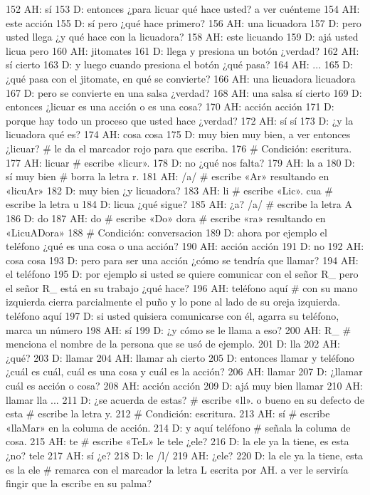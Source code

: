152 AH: sí
153 D: entonces ¿para licuar qué hace usted? a ver cuénteme
154 AH: este acción
155 D: sí pero ¿qué hace primero?
156 AH: una licuadora
157 D: pero usted llega ¿y qué hace con la licuadora?
158 AH: este licuando
159 D: ajá usted licua pero
160 AH: jitomates
161 D: llega y presiona un botón ¿verdad?
162 AH: sí cierto
163 D: y luego cuando presiona el botón ¿qué pasa?
164 AH: ...
165 D: ¿qué pasa con el jitomate, en qué se convierte?
166 AH: una licuadora licuadora
167 D: pero se convierte en una salsa ¿verdad?
168 AH: una salsa sí cierto
169 D: entonces ¿licuar es una acción o es una cosa?
170 AH: acción acción
171 D: porque hay todo un proceso que usted hace ¿verdad?
172 AH: sí sí
173 D: ¿y la licuadora qué es?
174 AH: cosa cosa
175 D: muy bien muy bien, a ver entonces ¿licuar? # le da el marcador rojo para que escriba.
176 # Condición: escritura.
177 AH: licuar # escribe «licur». 
178 D: no ¿qué nos falta?
179 AH: la a
180 D: sí muy bien # borra la letra r.
181 AH: /a/ # escribe «Ar» resultando en «licuAr»
182 D: muy bien ¿y licuadora?
183 AH: li # escribe «Lic». cua # escribe la letra u
184 D: licua ¿qué sigue?
185 AH: ¿a? /a/ # escribe la letra A
186 D: do
187 AH: do # escribe «Do» dora # escribe «ra» resultando en «LicuADora»
188 # Condición: conversacion
189 D: ahora por ejemplo el teléfono ¿qué es una cosa o una acción?
190 AH: acción acción
191 D: no
192 AH: cosa cosa
193 D: pero para ser una acción ¿cómo se tendría que llamar?
194 AH: el teléfono
195 D: por ejemplo si usted se quiere comunicar con el señor R_ pero el señor R_ está en su trabajo ¿qué hace?
196 AH: teléfono aquí # con su mano izquierda cierra parcialmente el puño y lo pone al lado de su oreja izquierda. teléfono aquí
197 D: si usted quisiera comunicarse con él, agarra su teléfono, marca un número
198 AH: sí
199 D: ¿y cómo se le llama a eso?
200 AH: R_ # menciona el nombre de la persona que se usó de ejemplo.
201 D: lla
202 AH: ¿qué?
203 D: llamar
204 AH: llamar ah cierto
205 D: entonces llamar y teléfono ¿cuál es cuál, cuál es una cosa y cuál es la acción?
206 AH: llamar
207 D: ¿llamar cuál es acción o cosa?
208 AH: acción acción
209 D: ajá muy bien llamar
210 AH: llamar lla ...
211 D: ¿se acuerda de estas? # escribe «ll». o bueno en su defecto de esta # escribe la letra y.
212 # Condición: escritura.
213 AH: sí # escribe «llaMar» en la columa de acción.
214 D: y aquí teléfono # señala la columa de cosa.
215 AH: te # escribe «TeL» le tele ¿ele?
216 D: la ele ya la tiene, es esta ¿no? tele
217 AH: sí ¿e?
218 D: le /l/
219 AH: ¿ele?
220 D: la ele ya la tiene, esta es la ele # remarca con el marcador la letra L escrita por AH. a ver le serviría fingir que la escribe en su palma?
